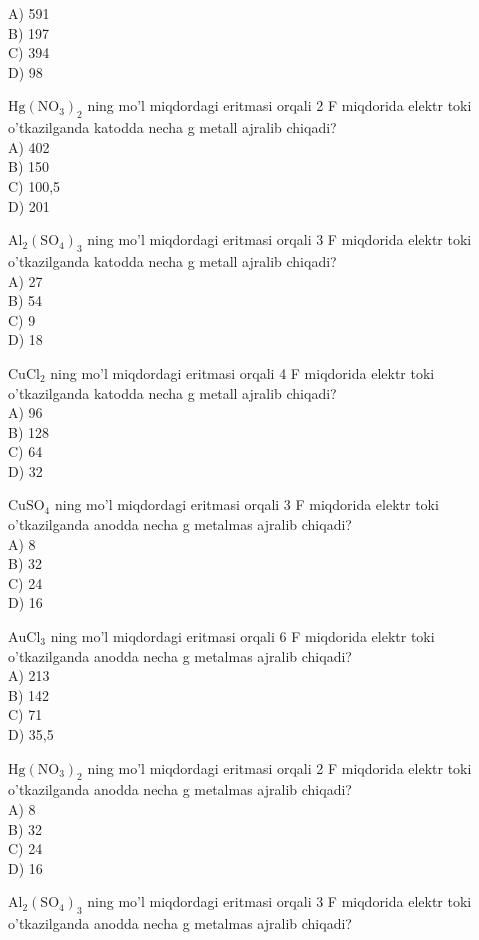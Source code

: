 A) 591\\
B) 197\\
C) 394\\
D) 98
  \item $\mathrm{Hg}\left(\mathrm{NO}_{3}\right)_{2}$ ning mo'l miqdordagi eritmasi orqali 2 F miqdorida elektr toki o'tkazilganda katodda necha g metall ajralib chiqadi?\\
A) 402\\
B) 150\\
C) 100,5\\
D) 201
  \item $\mathrm{Al}_{2}\left(\mathrm{SO}_{4}\right)_{3}$ ning mo'l miqdordagi eritmasi orqali 3 F miqdorida elektr toki o'tkazilganda katodda necha g metall ajralib chiqadi?\\
A) 27\\
B) 54\\
C) 9\\
D) 18
  \item $\mathrm{CuCl}_{2}$ ning mo'l miqdordagi eritmasi orqali 4 F miqdorida elektr toki o'tkazilganda katodda necha g metall ajralib chiqadi?\\
A) 96\\
B) 128\\
C) 64\\
D) 32
  \item $\mathrm{CuSO}_{4}$ ning mo'l miqdordagi eritmasi orqali 3 F miqdorida elektr toki o'tkazilganda anodda necha g metalmas ajralib chiqadi?\\
A) 8\\
B) 32\\
C) 24\\
D) 16
  \item $\mathrm{AuCl}_{3}$ ning mo'l miqdordagi eritmasi orqali 6 F miqdorida elektr toki o'tkazilganda anodda necha g metalmas ajralib chiqadi?\\
A) 213\\
B) 142\\
C) 71\\
D) 35,5
  \item $\mathrm{Hg}\left(\mathrm{NO}_{3}\right)_{2}$ ning mo'l miqdordagi eritmasi orqali 2 F miqdorida elektr toki o'tkazilganda anodda necha g metalmas ajralib chiqadi?\\
A) 8\\
B) 32\\
C) 24\\
D) 16
  \item $\mathrm{Al}_{2}\left(\mathrm{SO}_{4}\right)_{3}$ ning mo'l miqdordagi eritmasi orqali 3 F miqdorida elektr toki o'tkazilganda anodda necha g metalmas ajralib chiqadi?\\
